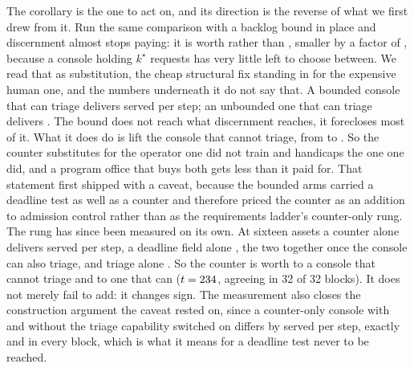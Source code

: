 \documentclass[11pt]{article}
\begin{document}
The corollary is the one to act on, and its direction is the reverse of what we first drew from it.
Run the same comparison with a backlog bound in place and discernment almost stops paying: it is
worth \FsBoundDiscernment{} rather than \FsDiscernment{}, smaller by a factor of \FsBoundShrink{},
because a console holding $k^{\star}$ requests has very little left to choose between. We read that
as substitution, the cheap structural fix standing in for the expensive human one, and the numbers
underneath it do not say that. A bounded console that can triage delivers \FsBoundSeeing{} served
per step; an unbounded one that can triage delivers \FsSeeing{}. The bound does not reach what
discernment reaches, it forecloses most of it. What it does do is lift the console that cannot
triage, from \FsNoisy{} to \FsBoundNoisy{}. So the counter substitutes for the operator one did not
train and handicaps the one one did, and a program office that buys both gets less than it paid for.
That statement first shipped with a caveat, because the bounded arms carried a deadline test as well
as a counter and therefore priced the counter as an addition to admission control rather than as the
requirements ladder's counter-only rung. The rung has since been measured on its own. At sixteen
assets a counter alone delivers \AcBoundAlone{} served per step, a deadline field alone
\AcDeadlineAlone{}, the two together \AcBoundPlusTriage{} once the console can also triage, and
triage alone \AcTriageAlone{}. So the counter is worth \AcBoundHelps{} to a console that cannot
triage and \AcBoundHurts{} to one that can ($t = 234{}$, agreeing in 32 of 32 blocks).
It does not merely fail to add: it changes sign. The measurement also closes the construction
argument the caveat rested on, since a counter-only console with and without the triage capability
switched on differs by \AcInertGap{} served per step, exactly and in every block, which is what it
means for a deadline test never to be reached.
\end{document}
